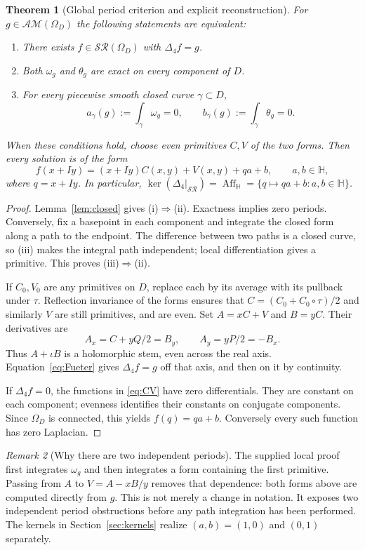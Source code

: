 \documentclass[11pt,a4paper]{article}
\numberwithin{equation}{section}
\newtheorem{theorem}{Theorem}[section]
\theoremstyle{definition}
\theoremstyle{remark}
\newtheorem{remark}[theorem]{Remark}
\newcommand{\HH}{\mathbb H}
\newcommand{\SR}{\mathcal{SR}}
\newcommand{\AM}{\mathcal{AM}}
\newcommand{\lap}{\Delta_4}
\newcommand{\aff}{\operatorname{Aff}_{\HH}}
\begin{document}
\begin{theorem}[Global period criterion and explicit reconstruction]
\label{thm:global}
For $g\in\AM(\Omega_D)$ the following statements are equivalent:
\begin{enumerate}[label=(\roman*)]
 \item There exists $f\in\SR(\Omega_D)$ with $\lap f=g$.
 \item Both $\omega_g$ and $\theta_g$ are exact on every component of $D$.
 \item For every piecewise smooth closed curve $\gamma\subset D$,
 \[
 a_\gamma(g):=\int_\gamma\omega_g=0,
 \qquad b_\gamma(g):=\int_\gamma\theta_g=0.
 \]
\end{enumerate}
When these conditions hold, choose even primitives $C,V$ of the two forms.
Then every solution is of the form
\begin{equation}
 f(x+Iy)=(x+Iy)C(x,y)+V(x,y)+qa+b,
 \qquad a,b\in\HH,
 \label{eq:reconstruction}
\end{equation}
where $q=x+Iy$. In particular,
$\ker(\lap|_{\SR})=\aff=\{q\mapsto qa+b:a,b\in\HH\}$.
\end{theorem}
\begin{proof}
Lemma~\ref{lem:closed} gives (i)$\Rightarrow$(ii). Exactness implies zero
periods. Conversely, fix a basepoint in each component and integrate the
closed form along a path to the endpoint. The difference between two
paths is a closed curve, so (iii) makes the integral path independent;
local differentiation gives a primitive. This proves (iii)$\Rightarrow$(ii).

If $C_0,V_0$ are any primitives on $D$, replace each by its average with
its pullback under $\tau$. Reflection invariance of the forms ensures
that $C=(C_0+C_0\circ\tau)/2$ and similarly $V$ are still primitives,
and are even. Set $A=xC+V$ and $B=yC$. Their derivatives are
\[
 A_x=C+yQ/2=B_y,\qquad A_y=yP/2=-B_x.
\]
Thus $A+\iota B$ is a holomorphic stem, even across the real axis.
Equation~\eqref{eq:Fueter} gives $\lap f=g$ off that axis, and then on it
by continuity.

If $\lap f=0$, the functions in \eqref{eq:CV} have zero differentials.
They are constant on each component; evenness identifies their constants
on conjugate components. Since $\Omega_D$ is connected, this yields
$f(q)=qa+b$. Conversely every such function has zero Laplacian.
\end{proof}

\begin{remark}[Why there are two independent periods]
The supplied local proof first integrates $\omega_g$ and then integrates a
form containing the first primitive. Passing from $A$ to $V=A-xB/y$
removes that dependence: both forms above are computed directly from $g$.
This is not merely a change in notation. It exposes two independent
period obstructions before any path integration has been performed.
The kernels in Section~\ref{sec:kernels} realize $(a,b)=(1,0)$ and
$(0,1)$ separately.
\end{remark}
\end{document}
